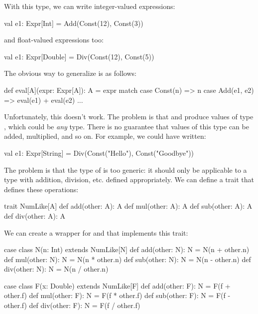 \documentclass[9pt]{extbook}
\begin{document}
With this type, we can write integer-valued expressions:
\begin{scalacode}
val e1: Expr[Int] = Add(Const(12), Const(3))
\end{scalacode}
and float-valued expressions too:
\begin{scalacode}
val e1: Expr[Double] = Div(Const(12), Const(5))
\end{scalacode}

The obvious way to generalize  is as follows:

\begin{scalacode}
def eval[A](expr: Expr[A]): A = expr match {
  case Const(n) => n
  case Add(e1, e2) => eval(e1) + eval(e2)
  ...
}
\end{scalacode}

Unfortunately, this doesn't work. The problem is that 
and  produce values of type , which could
be \emph{any} type. There is no guarantee that values of this type can
be added, multiplied, and so on. For example, we could have written:

\begin{scalacode}
val e1: Expr[String] = Div(Const("Hello"), Const("Goodbye"))
\end{scalacode}

The problem is that the type of  is too generic: it should
only be applicable to a type with addition, division, etc. defined appropriately.
We can define a trait that defines these operations:

\begin{scalacode}
trait NumLike[A] {
  def add(other: A): A
  def mul(other: A): A
  def sub(other: A): A
  def div(other: A): A
}
\end{scalacode}

We can create a wrapper for  and 
that implements this trait:

\begin{scalacode}
case class N(n: Int) extends NumLike[N] {
  def add(other: N): N = N(n + other.n)
  def mul(other: N): N = N(n * other.n)
  def sub(other: N): N = N(n - other.n)
  def div(other: N): N = N(n / other.n)
}

case class F(x: Double) extends NumLike[F] {
  def add(other: F): N = F(f + other.f)
  def mul(other: F): N = F(f * other.f)
  def sub(other: F): N = F(f - other.f)
  def div(other: F): N = F(f / other.f)
}
\end{scalacode}
\end{document}
